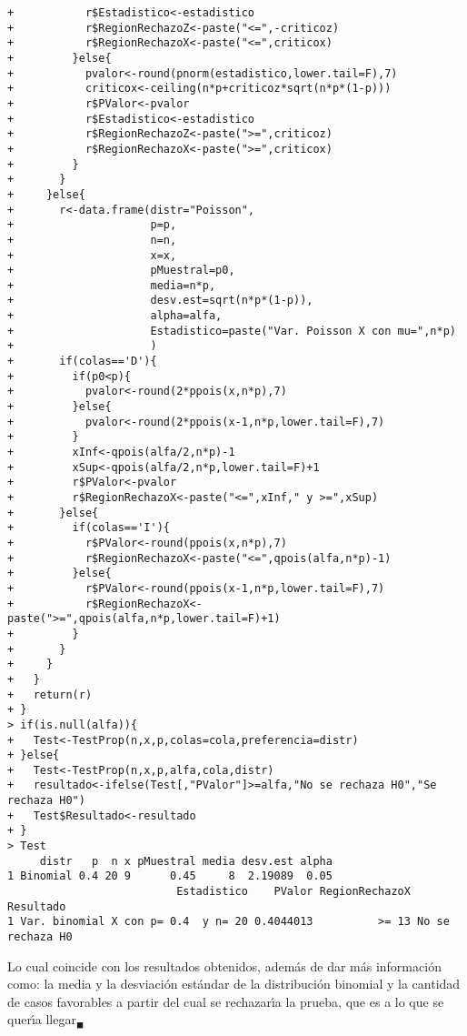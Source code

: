 \begin{solucion}
\begin{verbatim}
+           r$Estadistico<-estadistico
+           r$RegionRechazoZ<-paste("<=",-criticoz)
+           r$RegionRechazoX<-paste("<=",criticox)
+         }else{
+           pvalor<-round(pnorm(estadistico,lower.tail=F),7)
+           criticox<-ceiling(n*p+criticoz*sqrt(n*p*(1-p)))
+           r$PValor<-pvalor
+           r$Estadistico<-estadistico
+           r$RegionRechazoZ<-paste(">=",criticoz)
+           r$RegionRechazoX<-paste(">=",criticox)
+         }
+       }
+     }else{
+       r<-data.frame(distr="Poisson",
+                     p=p,
+                     n=n,
+                     x=x,
+                     pMuestral=p0,
+                     media=n*p,
+                     desv.est=sqrt(n*p*(1-p)),
+                     alpha=alfa,
+                     Estadistico=paste("Var. Poisson X con mu=",n*p)
+                     )
+       if(colas=='D'){
+         if(p0<p){
+           pvalor<-round(2*ppois(x,n*p),7)
+         }else{
+           pvalor<-round(2*ppois(x-1,n*p,lower.tail=F),7)
+         }
+         xInf<-qpois(alfa/2,n*p)-1
+         xSup<-qpois(alfa/2,n*p,lower.tail=F)+1
+         r$PValor<-pvalor
+         r$RegionRechazoX<-paste("<=",xInf," y >=",xSup)
+       }else{
+         if(colas=='I'){
+           r$PValor<-round(ppois(x,n*p),7)
+           r$RegionRechazoX<-paste("<=",qpois(alfa,n*p)-1)
+         }else{
+           r$PValor<-round(ppois(x-1,n*p,lower.tail=F),7)
+           r$RegionRechazoX<-paste(">=",qpois(alfa,n*p,lower.tail=F)+1)
+         }
+       }
+     }
+   }
+   return(r)
+ }
> if(is.null(alfa)){
+   Test<-TestProp(n,x,p,colas=cola,preferencia=distr)
+ }else{
+   Test<-TestProp(n,x,p,alfa,cola,distr)
+   resultado<-ifelse(Test[,"PValor"]>=alfa,"No se rechaza H0","Se rechaza H0")
+   Test$Resultado<-resultado
+ }
> Test
     distr   p  n x pMuestral media desv.est alpha
1 Binomial 0.4 20 9      0.45     8  2.19089  0.05
                          Estadistico    PValor RegionRechazoX        Resultado
1 Var. binomial X con p= 0.4  y n= 20 0.4044013          >= 13 No se rechaza H0
 \end{verbatim}
 Lo cual coincide con los resultados obtenidos, adem\'as de dar m\'as informaci\'on
 como: la media y la desviaci\'on est\'andar de la distribuci\'on binomial
 y la cantidad de casos favorables a partir del cual se rechazar\'{\i}a la prueba,
 que es a lo que se quer\'{\i}a llegar${}_{\blacksquare}$
 
\end{solucion}
